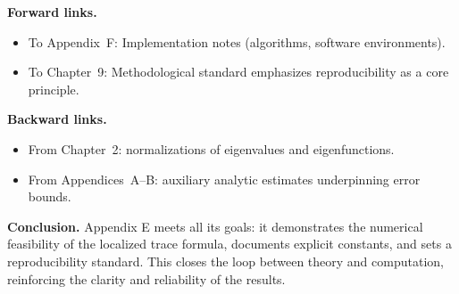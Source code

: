 \medskip
\noindent \textbf{Forward links.}
\begin{itemize}
  \item To Appendix~F: Implementation notes (algorithms, software environments).
  \item To Chapter~9: Methodological standard emphasizes reproducibility as a core principle.
\end{itemize}

\medskip
\noindent \textbf{Backward links.}
\begin{itemize}
  \item From Chapter~2: normalizations of eigenvalues and eigenfunctions.
  \item From Appendices~A--B: auxiliary analytic estimates underpinning error bounds.
\end{itemize}

\bigskip
\noindent \textbf{Conclusion.}
Appendix E meets all its goals: it demonstrates the numerical feasibility of the localized trace formula, documents explicit constants, and sets a reproducibility standard. This closes the loop between theory and computation, reinforcing the clarity and reliability of the results.

